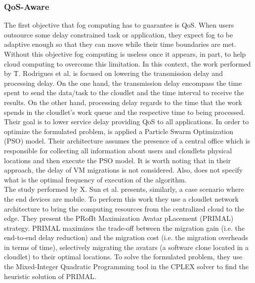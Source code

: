 \subsubsection{QoS-Aware}\label{sec:QoS}
The first objective that fog computing has to guarantee is QoS. When users outsource some delay constrained task or application, they expect fog to be adaptive enough so that they can move while their time boundaries are met. Without this objective fog computing is useless once it appears, in part, to help cloud computing to overcome this limitation.
\noindent\tab In this context, the work performed by T. Rodrigues \cite{rodrigues2017pso} et al. is focused on lowering the transmission delay and processing delay. On the one hand, the transmission delay encompass the time spent to send the data/task to the cloudlet and the time interval to receive the results. On the other hand, processing delay regards to the time that the work spends in the cloudlet's work queue and the respective time to being processed. Their goal is to lower service delay providing QoS to all applications. In order to optimize the formulated problem, is applied a Particle Swarm Optimization (PSO) model. Their architecture assumes the presence of a central office which is responsible for collecting all information about users and cloudlets physical locations and then execute the PSO model. It is worth noting that in their approach, the delay of VM migrations is not considered. Also, does not specify what is the optimal frequency of execution of the algorithm.\\
\noindent\tab The study performed by X. Sun et al. \cite{sun2016primal} presents, similarly, a case scenario where the end devices are mobile. To perform this work they use a cloudlet network architecture to bring the computing resources from the centralized cloud to the edge. They present the PRofIt Maximization Avatar pLacement (PRIMAL) strategy. PRIMAL maximizes the trade-off between the migration gain (i.e. the end-to-end delay reduction) and the migration cost (i.e. the migration overheads in terms of time), selectively migrating the avatars (a software clone located in a cloudlet) to their optimal locations. To solve the formulated problem, they use the Mixed-Integer Quadratic Programming tool in the CPLEX solver to find the heuristic solution of PRIMAL.\\
